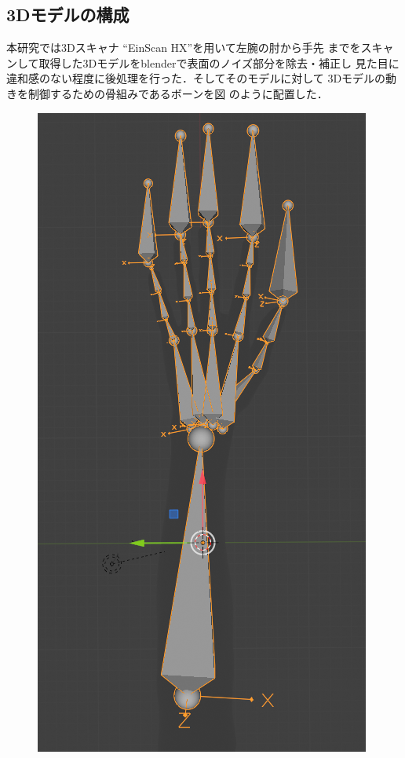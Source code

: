 \documentclass{ltjsarticle}
\begin{document}
	\subsection{3Dモデルの構成}
		本研究では3Dスキャナ ``EinScan HX''を用いて左腕の肘から手先
		までをスキャンして取得した3Dモデルをblenderで表面のノイズ部分を除去・補正し
		見た目に違和感のない程度に後処理を行った．そしてそのモデルに対して
		3Dモデルの動きを制御するための骨組みであるボーンを図
		のように配置した．
		\begin{figure}[H]
		\centering
		\begin{minipage}{0.26\columnwidth}
		\centering
		\includegraphics[width = \columnwidth]{figs/handbone.png}

\end{minipage}
\end{figure}
\end{document}
